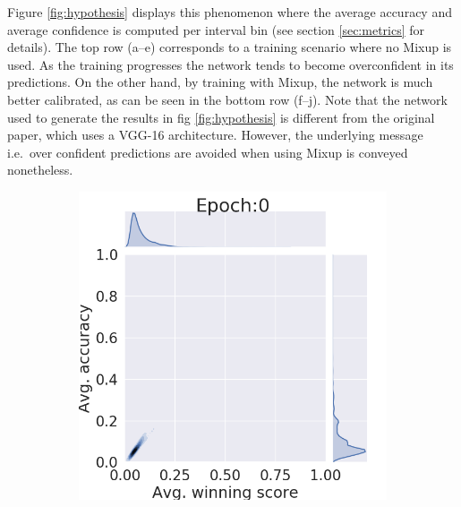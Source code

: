 \documentclass{article}
\begin{document}
Figure \ref{fig:hypothesis} displays this phenomenon where the average accuracy and average confidence is computed per interval bin (see section \ref{sec:metrics} for details). The top row (a--e) corresponds to a training scenario where no Mixup is used. As the training progresses the network tends to become overconfident in its predictions. %
On the other hand, by training with Mixup, the network is much better calibrated, as can be seen in the bottom row (f--j). Note that the network used to generate the results in fig \ref{fig:hypothesis} is different from the original paper, which uses a VGG-16 architecture. However, the underlying message i.e.\ over confident predictions are avoided when using Mixup is conveyed nonetheless.  
\begin{figure}[htb]
     \centering
     \begin{subfigure}[b]{0.19\textwidth}
         \centering
         \noindent\includegraphics[width=\textwidth]{images/joint_plot/no_mixup/0.png}
         \caption{}
     \end{subfigure}
     \hfill
     \begin{subfigure}[b]{0.19\textwidth}
         \centering

\end{subfigure}
\end{figure}
\end{document}
